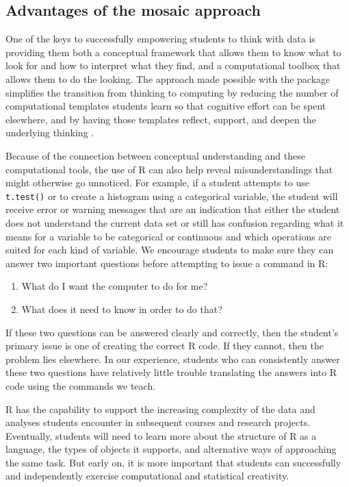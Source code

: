 \subsection{Advantages of the mosaic
approach}\label{advantages-of-the-mosaic-approach}

One of the keys to successfully empowering students to think with data
is providing them both a conceptual framework that allows them to know
what to look for and how to interpret what they find, and a
computational toolbox that allows them to do the looking. The approach
made possible with the  package simplifies the transition
from thinking to computing by reducing the number of computational
templates students learn so that cognitive effort can be spent
elsewhere, and by having those templates reflect, support, and deepen
the underlying thinking \citep{Grolemund:ISR:2014}.

Because of the connection between conceptual understanding and these
computational tools, the use of R can also help reveal misunderstandings
that might otherwise go unnoticed. For example, if a student attempts to
use \texttt{t.test()} or to create a histogram using a categorical
variable, the student will receive error or warning messages that are an
indication that either the student does not understand the current data
set or still has confusion regarding what it means for a variable to be
categorical or continuous and which operations are suited for each kind
of variable. We encourage students to make sure they can answer two
important questions before attempting to issue a command in R:

\begin{enumerate}
\def\labelenumi{\arabic{enumi}.}
\item
  What do I want the computer to do for me?
\item
  What does it need to know in order to do that?
\end{enumerate}

If these two questions can be answered clearly and correctly, then the
student's primary issue is one of creating the correct R code. If they
cannot, then the problem lies elsewhere. In our experience, students who
can consistently answer these two questions have relatively little
trouble translating the answers into R code using the commands we teach.

R has the capability to support the increasing complexity of the data
and analyses students encounter in subsequent courses and research
projects. Eventually, students will need to learn more about the
structure of R as a language, the types of objects it supports, and
alternative ways of approaching the same task. But early on, it is more
important that students can successfully and independently exercise
computational and statistical creativity.

